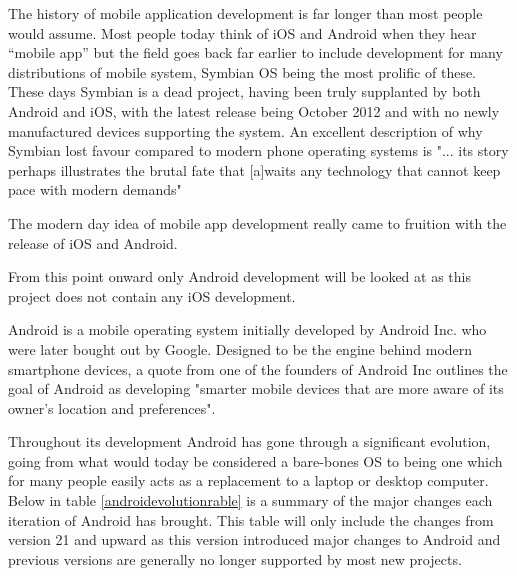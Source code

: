 
The history of mobile application development is far longer than most people would assume. Most people today think of iOS and Android when they hear “mobile app” but the field goes back far earlier to include development for many distributions of mobile system, Symbian OS being the most prolific of these. These days Symbian is a dead project, having been truly supplanted by both Android and iOS, with the latest release being October 2012 and with no newly manufactured devices supporting the system. An excellent description of why Symbian lost favour compared to modern phone operating systems is "... its story perhaps illustrates the brutal fate that [a]waits any technology that cannot keep pace with modern demands"\cite{symbianfailureref}

The modern day idea of mobile app development really came to fruition with the release of iOS and Android.

From this point onward only Android development will be looked at as this project does not contain any iOS development.

Android is a mobile operating system initially developed by Android Inc. who were later bought out by Google\cite{evolutionofandroidgooglebuyoutref}. Designed to be the engine behind modern smartphone devices, a quote from one of the founders of Android Inc outlines the goal of Android as developing "smarter mobile devices that are more aware of its owner’s location and preferences"\cite{androidauthorityinitialdescriptionref}.

Throughout its development Android has gone through a significant evolution, going from what would today be considered a bare-bones OS to being one which for many people easily acts as a replacement to a laptop or desktop computer. Below in table \ref{androidevolutionrable} is a summary of the major changes each iteration of Android has brought. This table will only include the changes from version 21 and upward as this version introduced major changes to Android and previous versions are generally no longer supported by most new projects.

